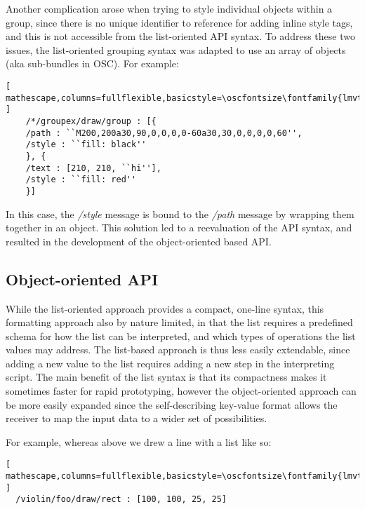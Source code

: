 Another complication arose when trying to style individual objects within a group, since there is no unique identifier to reference for adding inline style tags, and this is not accessible from the list-oriented API syntax. 
To address these two issues, the list-oriented grouping syntax was adapted to use an array of objects (aka sub-bundles in OSC). For example:
 
\begin{lstlisting}[ mathescape,columns=fullflexible,basicstyle=\oscfontsize\fontfamily{lmvtt}\selectfont ]
    /*/groupex/draw/group : [{
	/path : ``M200,200a30,90,0,0,0,0-60a30,30,0,0,0,0,60'',
	/style : ``fill: black''
    }, {
	/text : [210, 210, ``hi''],
	/style : ``fill: red''
    }]
\end{lstlisting}

\noindent
In this case, the \textit{/style} message is bound to the \textit{/path} message by wrapping them together in an object. 
This solution led to a reevaluation of the \drawsocket API syntax, and resulted in the development of the object-oriented based API.

\subsection{Object-oriented API}\label{sec:objstyle}
While the list-oriented approach provides a compact, one-line syntax, this formatting approach also by nature limited, in that the list requires a predefined schema for how the list can be interpreted, and which types of operations the list values may address. 
The list-based approach is thus less easily extendable, since adding a new value to the list requires adding a new step in the interpreting script.
The main benefit of the list syntax is that its compactness makes it sometimes faster for rapid prototyping, however the object-oriented approach can be more easily expanded since the self-describing key-value format allows the receiver to map the input data to a wider set of possibilities.


For example, whereas above we drew a line with a list like so:
\begin{lstlisting}[ mathescape,columns=fullflexible,basicstyle=\oscfontsize\fontfamily{lmvtt}\selectfont ]
  /violin/foo/draw/rect : [100, 100, 25, 25]
\end{lstlisting}

